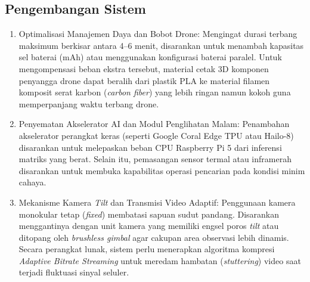 \subsection{Pengembangan Sistem}
\begin{enumerate}
	\item Optimalisasi Manajemen Daya dan Bobot Drone: Mengingat durasi terbang maksimum berkisar antara 4--6 menit, disarankan untuk menambah kapasitas sel baterai (mAh) atau menggunakan konfigurasi baterai paralel. Untuk mengompensasi beban ekstra tersebut, material cetak 3D komponen penyangga drone dapat beralih dari plastik PLA ke material filamen komposit serat karbon (\textit{carbon fiber}) yang lebih ringan namun kokoh guna memperpanjang waktu terbang drone.
	\item Penyematan Akselerator AI dan Modul Penglihatan Malam: Penambahan akselerator perangkat keras (seperti Google Coral Edge TPU atau Hailo-8) disarankan untuk melepaskan beban CPU Raspberry Pi 5 dari inferensi matriks yang berat. Selain itu, pemasangan sensor termal atau inframerah disarankan untuk membuka kapabilitas operasi pencarian pada kondisi minim cahaya.
	\item Mekanisme Kamera \textit{Tilt} dan Transmisi Video Adaptif: Penggunaan kamera monokular tetap (\textit{fixed}) membatasi sapuan sudut pandang. Disarankan menggantinya dengan unit kamera yang memiliki engsel poros \textit{tilt} atau ditopang oleh \textit{brushless gimbal} agar cakupan area observasi lebih dinamis. Secara perangkat lunak, sistem perlu menerapkan algoritma kompresi \textit{Adaptive Bitrate Streaming} untuk meredam hambatan (\textit{stuttering}) video saat terjadi fluktuasi sinyal seluler.
\end{enumerate}

